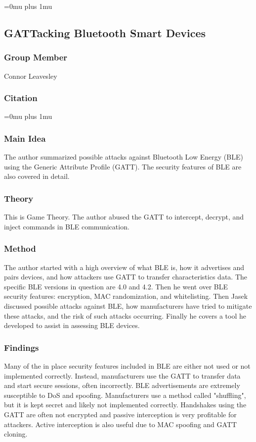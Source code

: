 \Urlmuskip=0mu plus 1mu\relax

\noindent
\subsection{{GATT}acking {B}luetooth {S}mart {D}evices}

\subsubsection{Group Member}

\noindent
Connor Leavesley

\noindent
\subsubsection{Citation}

\Urlmuskip=0mu plus 1mu\relax

\subsubsection{Main Idea}
The author summarized possible attacks against Bluetooth Low Energy (BLE) using the Generic Attribute Profile (GATT). The security features of BLE are also covered in detail. 
\noindent


\subsubsection{Theory}
This is Game Theory. The author abused the GATT to intercept, decrypt, and inject commands in BLE communication.
\noindent


\subsubsection{Method}
The author started with a high overview of what BLE is, how it advertises and pairs devices, and how attackers use GATT to transfer characteristics data. The specific BLE versions in question are 4.0 and 4.2. Then he went over BLE security features: encryption, MAC randomization, and whitelisting. Then Jasek discussed possible attacks against BLE, how manufacturers have tried to mitigate these attacks, and the risk of such attacks occurring. Finally he covers a tool he developed to assist in assessing BLE devices. 
\noindent


\subsubsection{Findings}
Many of the in place security features included in BLE are either not used or not implemented correctly. Instead, manufacturers use the GATT to transfer data and start secure sessions, often incorrectly. BLE advertisements are extremely susceptible to DoS and spoofing. Manufacturers use a method called "shuffling", but it is kept secret and likely not implemented correctly. Handshakes using the GATT are often not encrypted and passive interception is very profitable for attackers. Active interception is also useful due to MAC spoofing and GATT cloning. 
\noindent


